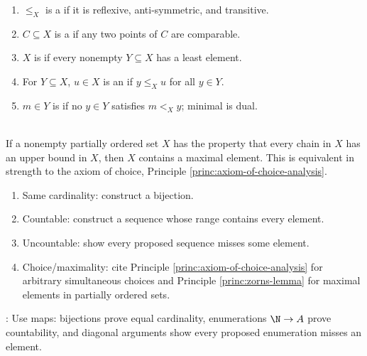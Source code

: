 \begin{definition} \label{def:ordered-set-vocabulary} 
\begin{enumerate}[label=(\roman*)]
\setlength{\itemsep}{0pt}
\item $\leq_X$ is a  if it is reflexive, anti-symmetric, and transitive.
\item $C\subseteq X$ is a  if any two points of $C$ are comparable.
\item $X$ is  if every nonempty $Y\subseteq X$ has a least element.
\item For $Y\subseteq X$, $u\in X$ is an  if $y\leq_Xu$ for all $y\in Y$.
\item $m\in Y$ is  if no $y\in Y$ satisfies $m<_Xy$; minimal is dual.
\end{enumerate}
\end{definition}

\begin{principle} \label{princ:zorns-lemma} \\
If a nonempty partially ordered set $X$ has the property that every chain in $X$ has an upper bound in $X$, then $X$ contains a maximal element. This is equivalent in strength to the axiom of choice, Principle \ref{princ:axiom-of-choice-analysis}.
\end{principle}

\begin{method} \label{meth:cardinality-proof-patterns}\label{meth:cardinality-proof-patterns-source-todo} 
\begin{enumerate}[label=(\roman*)]
\setlength{\itemsep}{0pt}
\item Same cardinality: construct a bijection.
\item Countable: construct a sequence whose range contains every element.
\item Uncountable: show every proposed sequence misses some element.
\item Choice/maximality: cite Principle \ref{princ:axiom-of-choice-analysis} for arbitrary simultaneous choices and Principle \ref{princ:zorns-lemma} for maximal elements in partially ordered sets.
\end{enumerate}
: Use maps: bijections prove equal cardinality, enumerations $\N\to A$ prove countability, and diagonal arguments show every proposed enumeration misses an element.
\end{method}
